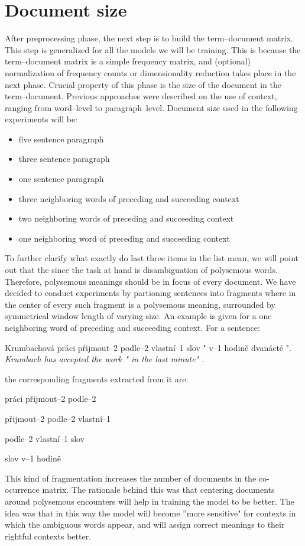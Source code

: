 \section{Document size}
After preprocessing phase, the next step is to build the term--document matrix. This step is generalized for all the models we will be training. This is because the term--document matrix is a simple frequency matrix, and (optional) normalization of frequency counts or dimensionality reduction takes place in the next phase. Crucial property of this phase is the size of the document in the term--document. Previous approaches were described on the use of context, ranging from word--level to paragraph--level. Document size used in the following experiments will be: 
\begin{itemize}
\item five sentence paragraph
\item three sentence paragraph
\item one sentence paragraph
\item three neighboring words of preceding and succeeding context
\item two neighboring words of preceding and succeeding context
\item one neighboring word of preceding and succeeding context
\end{itemize}
To further clarify what exactly do last three items in the list mean, we will point out that the since the task
at hand is disambiguation of polysemous words. Therefore, polysemous meanings should be in focus of
every document. We have decided to conduct experiments by partioning sentences into fragments where 
in the center of every such fragment is a polysemous meaning, surrounded by symmetrical window 
length of varying size. An example is given for a one neighboring word of preceding and succeeding context. For a sentence:
\begin{examples}
\item Krumbachov\'a pr\'aci p\v{r}ijmout--2 podle--2 vlastn\'i--1 slov " v--1 hodin\v{e} dvan\'act\'e ".
\glt \textit{  Krumbach has accepted the work " in the last minute" .}
\end{examples}
the corresponding fragments extracted from it are:
\begin{examples}
\item pr\'aci p\v{r}ijmout--2 podle--2
\item p\v{r}ijmout--2 podle--2 vlastn\'i--1
\item podle--2 vlastn\'i--1 slov
\item slov v--1 hodin\v{e}
\end{examples}
This kind of fragmentation increases the number of documents in the co-ocurrence matrix. The rationale behind this was that centering documents around polysemous encounters will help in training the model to be better. The idea was that in this way the model will become ''more sensitive" for contexts in which the ambiguous words appear, and will assign correct meanings to their rightful contexts better. 

